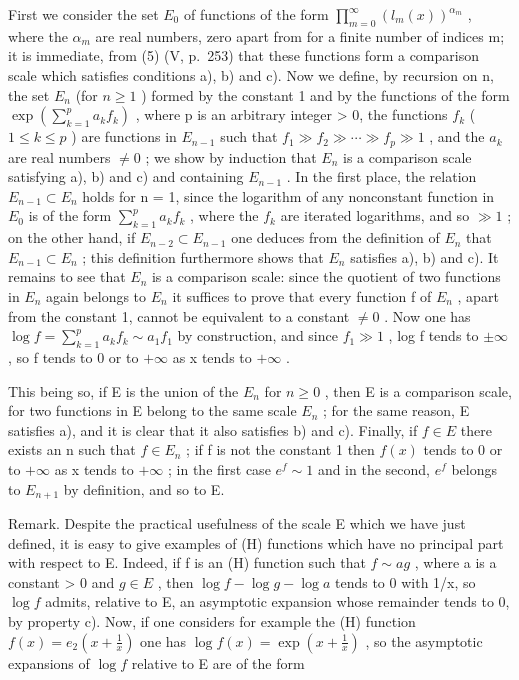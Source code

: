 First we consider the set \(E_{0}\) of functions of the form \(\prod_{m=0}^{\infty}\left(l_{m}(x)\right)^{\alpha_{m}}\) , where the \(\alpha_{m}\) are real numbers, zero apart from for a finite number of indices m; it is immediate, from (5) (V, p.~253) that these functions form a comparison scale which satisfies conditions a), b) and c). Now we define, by recursion on n, the set \(E_{n}\) (for \(n \geqslant 1\) ) formed by the constant 1 and by the functions of the form \(\exp\left(\sum_{k=1}^{p}a_{k}f_{k}\right)\) , where p is an arbitrary integer \textgreater{} 0, the functions \(f_{k}\) ( \(1 \leqslant k \leqslant p\) ) are functions in \(E_{n-1}\) such that \(f_{1} \gg f_{2} \gg \cdots \gg f_{p} \gg 1\) , and the \(a_{k}\) are real numbers \(\neq 0\) ; we show by induction that \(E_{n}\) is a comparison scale satisfying a), b) and c) and containing \(E_{n-1}\) . In the first place, the relation \(E_{n-1} \subset E_{n}\) holds for n = 1, since the logarithm of any nonconstant function in \(E_{0}\) is of the form \(\sum_{k=1}^{p}a_{k}f_{k}\) , where the \(f_{k}\) are iterated logarithms, and so \(\gg 1\) ; on the other hand, if \(E_{n-2} \subset E_{n-1}\) one deduces from the definition of \(E_{n}\) that \(E_{n-1} \subset E_{n}\) ; this definition furthermore shows that \(E_{n}\) satisfies a), b) and c). It remains to see that \(E_{n}\) is a comparison scale: since the quotient of two functions in \(E_{n}\) again belongs to \(E_{n}\) it suffices to prove that every function f of \(E_{n}\) , apart from the constant 1, cannot be equivalent to a constant \(\neq 0\) . Now one has \(\log f = \sum_{k=1}^{p}a_{k}f_{k} \sim a_{1}f_{1}\) by construction, and since \(f_{1} \gg 1\) , log f tends to \(\pm\infty\) , so f tends to 0 or to \(+\infty\) as x tends to \(+\infty\) .

This being so, if E is the union of the \(E_{n}\) for \(n \geqslant 0\) , then E is a comparison scale, for two functions in E belong to the same scale \(E_{n}\) ; for the same reason, E satisfies a), and it is clear that it also satisfies b) and c). Finally, if \(f \in E\) there exists an n such that \(f \in E_{n}\) ; if f is not the constant 1 then \(f(x)\) tends to 0 or to \(+\infty\) as x tends to \(+\infty\) ; in the first case \(e^{f} \sim 1\) and in the second, \(e^{f}\) belongs to \(E_{n+1}\) by definition, and so to E.

Remark. Despite the practical usefulness of the scale E which we have just defined, it is easy to give examples of (H) functions which have no principal part with respect to E. Indeed, if f is an (H) function such that \(f \sim ag\) , where a is a constant \textgreater{} 0 and \(g \in E\) , then \(\log f - \log g - \log a\) tends to 0 with 1/x, so \(\log f\) admits, relative to E, an asymptotic expansion whose remainder tends to 0, by property c). Now, if one considers for example the (H) function \(f(x) = e_{2}\left(x + \frac{1}{x}\right)\) one has \(\log f(x) = \exp\left(x + \frac{1}{x}\right)\) , so the asymptotic expansions of \(\log f\) relative to E are of the form


